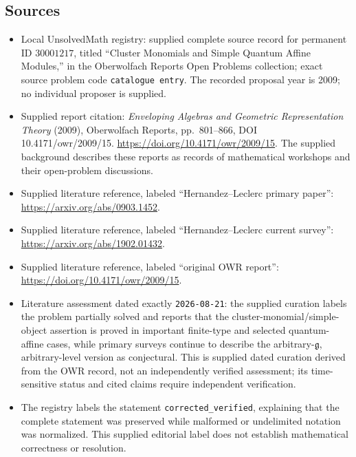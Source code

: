 \documentclass[11pt]{article}
\begin{document}
\subsection{Sources}
\begin{itemize}
\item Local UnsolvedMath registry: supplied complete source record for permanent ID \(30001217\), titled ``Cluster Monomials and Simple Quantum Affine Modules,'' in the Oberwolfach Reports Open Problems collection; exact source problem code \texttt{catalogue entry}. The recorded proposal year is 2009; no individual proposer is supplied.
\item Supplied report citation: \emph{Enveloping Algebras and Geometric Representation Theory} (2009), Oberwolfach Reports, pp.\ 801--866, DOI 10.4171/owr/2009/15. \url{https://doi.org/10.4171/owr/2009/15}. The supplied background describes these reports as records of mathematical workshops and their open-problem discussions.
\item Supplied literature reference, labeled ``Hernandez--Leclerc primary paper'': \url{https://arxiv.org/abs/0903.1452}.
\item Supplied literature reference, labeled ``Hernandez--Leclerc current survey'': \url{https://arxiv.org/abs/1902.01432}.
\item Supplied literature reference, labeled ``original OWR report'': \url{https://doi.org/10.4171/owr/2009/15}.
\item Literature assessment dated exactly \texttt{2026-08-21}: the supplied curation labels the problem partially solved and reports that the cluster-monomial/simple-object assertion is proved in important finite-type and selected quantum-affine cases, while primary surveys continue to describe the arbitrary-\(\mathfrak g\), arbitrary-level version as conjectural. This is supplied dated curation derived from the OWR record, not an independently verified assessment; its time-sensitive status and cited claims require independent verification.
\item The registry labels the statement \texttt{corrected\_verified}, explaining that the complete statement was preserved while malformed or undelimited notation was normalized. This supplied editorial label does not establish mathematical correctness or resolution.
\end{itemize}
\end{document}

